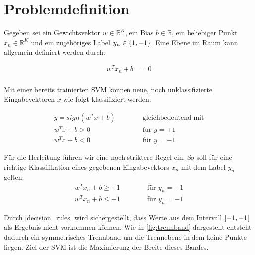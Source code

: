\documentclass[a4paper,11pt,twoside]{scrreprt}
\begin{document}
\section{Problemdefinition} \label{sec:problem_def}
Gegeben sei ein Gewichtsvektor $w \in \mathbb{R}^{K}$, ein Bias $b \in \mathbb{R}$, ein beliebiger Punkt $x_{n} \in \mathbb{R}^{K}$ und ein zugehöriges Label $y_{n} \in \{\-1, +1\}$. Eine Ebene im Raum kann allgemein definiert werden durch:

\begin{equation} \label{plane_eq}
    \begin{aligned}
    w^{T} x_{n} + b &= 0 \\
    \end{aligned}
\end{equation}

Mit einer bereits trainierten \ac{SVM} können neue, noch unklassifizierte Eingabevektoren $x$ wie folgt klassifiziert werden:

\begin{subequations} \label{svm_classify1}
	\begin{alignat}{2}
		y = sign(w^{T} x + b)  & \qquad & \text{ gleichbedeutend mit} \\
		w^{T} x + b > 0 & & \text{ für } y = +1\\
		w^{T} x + b < 0 & & \text{ für } y = -1
	\end{alignat}
\end{subequations}


Für die Herleitung führen wir eine noch striktere Regel ein. So soll für eine richtige Klassifikation eines gegebenen Eingabevektors $x_{n}$ mit dem Label $y_{n}$ gelten:
\begin{subequations} \label{decision_rules}
	\begin{alignat}{2}
		w^{T} x_{n} + b \geq +1 & \qquad & \text{ für } y_{n} = +1\\
		w^{T} x_{n} + b \leq -1 & & \text{ für } y_{n} = -1
	\end{alignat}
\end{subequations}


Durch \autoref{decision_rules} wird sichergestellt, dass Werte aus dem Intervall $\interval[open]{-1}{+1}$ als Ergebnis nicht vorkommen können. Wie in \autoref{fig:trennband} dargestellt entsteht dadurch ein symmetrisches Trennband um die Trennebene in dem keine Punkte liegen. Ziel der \ac{SVM} ist die Maximierung der Breite dieses Bandes.\\
\end{document}
